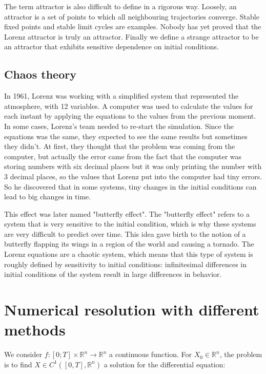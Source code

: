 \documentclass[12pt]{article}
\begin{document}
	\noindent The term attractor is also difficult to define in a rigorous way. Loosely, an attractor is a set of points to which all neighbouring trajectories converge. Stable fixed points and
	stable limit cycles are examples. Nobody has yet proved that the Lorenz attractor is truly an attractor. Finally we define a strange attractor to be an attractor that exhibits sensitive dependence on initial conditions\cite{partie1_ref2}.
	
	\subsection{Chaos theory}
	
	In 1961, Lorenz was working with a simplified system that represented the atmosphere, with 12 variables. A computer was used to calculate the values for each instant by applying the equations to the values from the previous moment. In some cases, Lorenz’s team needed to re-start the simulation. Since the equations was the same, they expected to see the same results but sometimes they didn’t. At first, they thought that the problem was coming from the computer, but actually the error came from the fact that the computer was storing numbers with six decimal places but it was only printing the number with 3 decimal places, so the values that Lorenz put into the computer had tiny errors. So he discovered that in some systems, tiny changes in the initial conditions can lead to big changes in time.
	
	\noindent This effect was later named "butterfly effect". The "butterfly effect" refers to a system that is very sensitive to the initial condition, which is why these systems are very difficult to predict over time. This idea gave birth to the notion of a butterfly flapping its wings in a region of the world and causing a tornado.
	The Lorenz equations are a chaotic system, which means that this type of system is roughly defined by sensitivity to initial conditions: infinitesimal differences in initial conditions of the system result in large differences in behavior.
	
	\section{Numerical resolution with different methods}
	
	We consider $f : [0; T] \times \mathbb{R}^n \rightarrow \mathbb{R}^n$ a continuous function. For $X_0\in \mathbb{R}^n$, the problem is to find  $X\in C^1([0,T],\mathbb{R}^n)$ a solution for the differential equation:
	
\end{document}
